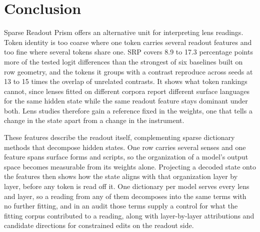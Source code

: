 \section{Conclusion}

Sparse Readout Prism offers an alternative unit for interpreting
lens readings. Token identity is too coarse where one token carries
several readout features and too fine where several tokens share one.
SRP covers 8.9 to 17.3 percentage points more of the tested logit
differences than the strongest of six baselines built on row geometry, and the tokens it
groups with a contrast reproduce across seeds at 13 to 15 times the
overlap of unrelated contrasts. It shows what token rankings cannot,
since lenses fitted on different corpora report different surface
languages for the same hidden state while the same readout feature
stays dominant under both. Lens studies therefore gain a reference
fixed in the weights, one that tells a change in the state apart from
a change in the instrument.

These features describe the readout itself, complementing sparse
dictionary methods that decompose hidden states. One row carries
several senses and one feature spans surface forms and
scripts, so the organization of a model's output space becomes
measurable from its weights alone. Projecting a decoded state onto the
features then shows how the state aligns with that organization layer
by layer, before any token is read off it. One dictionary per model
serves every lens and layer, so a reading from any of them decomposes
into the same terms with no further fitting, and in an audit those
terms supply a control for what the fitting corpus contributed to a
reading, along with layer-by-layer attributions and candidate
directions for constrained edits on the readout side.
